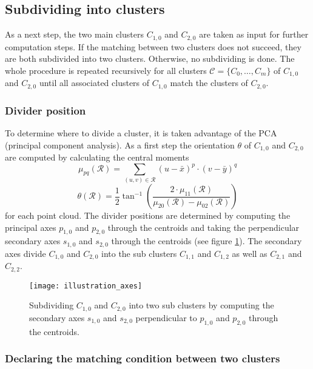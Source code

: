 \subsection{Subdividing into clusters}

As a next step, the two main clusters $C_{1,0}$ and $C_{2,0}$ are taken as input for further computation steps. If the matching between two clusters does not succeed, they are both subdivided into two clusters. Otherwise, no subdividing is done. The whole procedure is repeated recursively for all clusters $\mathcal{C} = \{C_0, \ldots, C_m\}$ of $C_{1,0}$ and $C_{2,0}$ until all associated clusters of $C_{1,0}$ match the clusters of $C_{2,0}$.  

\subsubsection{Divider position}

To determine where to divide a cluster, it is taken advantage of the PCA (principal component analysis). As a first step the orientation $\theta$ of $C_{1,0}$ and $C_{2,0}$ are computed by calculating the central moments
\begin{equation}
	\mu_{pq}(\mathcal{R}) = \sum_{(u,v)\in\mathcal{R}} (u - \bar{x})^p \cdot (v - \bar{y})^q
\end{equation}
\begin{equation}
	\theta(\mathcal{R}) = \frac{1}{2} \tan^{-1} \left(\frac{2\cdot \mu_{11}(\mathcal{R})}{\mu_{20}(\mathcal{R}) - \mu_{02}(\mathcal{R})}\right)
\end{equation}
for each point cloud.	
The divider positions are determined by computing the principal axes $p_{1,0}$ and $p_{2,0}$ through the centroids and taking the perpendicular secondary axes $s_{1,0}$ and $s_{2,0}$ through the centroids (see figure \ref{fig:dc_axes_2p}). The secondary axes divide $C_{1,0}$ and $C_{2,0}$ into the sub clusters $C_{1,1}$ and $C_{1,2}$ as well as $C_{2,1}$ and $C_{2,2}$.

\begin{figure}
	\centering
	\texttt{[image: illustration\_axes]}
	\caption{Subdividing $C_{1,0}$ and $C_{2,0}$ into two sub clusters by computing the secondary axes $s_{1,0}$ and $s_{2,0}$ perpendicular to $p_{1,0}$ and $p_{2,0}$ through the centroids.}
	\label{fig:dc_axes_2p}
\end{figure}

\subsubsection{Declaring the matching condition between two clusters}

